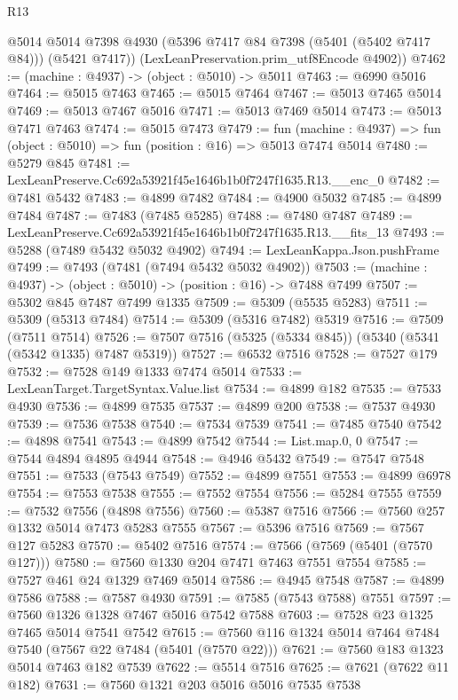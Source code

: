 \begin{lexlean}{R13}
\begin{coremodule}
        @5014
        @5014
        @7398
        @4930
        (@5396 @7417 @84 @7398 (@5401 (@5402 @7417 @84)))
        (@5421 @7417))
      (LexLeanPreservation.prim_utf8Encode @4902))
@7462 := (machine : @4937) -> (object : @5010) -> @5011
@7463 := @6990 @5016
@7464 := @5015 @7463
@7465 := @5015 @7464
@7467 := @5013 @7465 @5014
@7469 := @5013 @7467 @5016
@7471 := @5013 @7469 @5014
@7473 := @5013 @7471 @7463
@7474 := @5015 @7473
@7479 := fun (machine : @4937) => fun (object : @5010) => fun (position : @16) => @5013 @7474 @5014
@7480 := @5279 @845
@7481 := LexLeanPreserve.Cc692a53921f45e1646b1b0f7247f1635.R13.__enc_0
@7482 := @7481 @5432
@7483 := @4899 @7482
@7484 := @4900 @5032
@7485 := @4899 @7484
@7487 := @7483 (@7485 @5285)
@7488 := @7480 @7487
@7489 := LexLeanPreserve.Cc692a53921f45e1646b1b0f7247f1635.R13.__fits_13
@7493 := @5288 (@7489 @5432 @5032 @4902)
@7494 := LexLeanKappa.Json.pushFrame
@7499 := @7493 (@7481 (@7494 @5432 @5032 @4902))
@7503 := (machine : @4937) -> (object : @5010) -> (position : @16) -> @7488 @7499
@7507 := @5302 @845 @7487 @7499 @1335
@7509 := @5309 (@5535 @5283)
@7511 := @5309 (@5313 @7484)
@7514 := @5309 (@5316 @7482) @5319
@7516 := @7509 (@7511 @7514)
@7526 := @7507 @7516 (@5325 (@5334 @845)) (@5340 (@5341 (@5342 @1335) @7487 @5319))
@7527 := @6532 @7516
@7528 := @7527 @179
@7532 := @7528 @149 @1333 @7474 @5014
@7533 := LexLeanTarget.TargetSyntax.Value.list
@7534 := @4899 @182
@7535 := @7533 @4930
@7536 := @4899 @7535
@7537 := @4899 @200
@7538 := @7537 @4930
@7539 := @7536 @7538
@7540 := @7534 @7539
@7541 := @7485 @7540
@7542 := @4898 @7541
@7543 := @4899 @7542
@7544 := List.map.{0, 0}
@7547 := @7544 @4894 @4895 @4944
@7548 := @4946 @5432
@7549 := @7547 @7548
@7551 := @7533 (@7543 @7549)
@7552 := @4899 @7551
@7553 := @4899 @6978
@7554 := @7553 @7538
@7555 := @7552 @7554
@7556 := @5284 @7555
@7559 := @7532 @7556 (@4898 @7556)
@7560 := @5387 @7516
@7566 := @7560 @257 @1332 @5014 @7473 @5283 @7555
@7567 := @5396 @7516
@7569 := @7567 @127 @5283
@7570 := @5402 @7516
@7574 := @7566 (@7569 (@5401 (@7570 @127)))
@7580 := @7560 @1330 @204 @7471 @7463 @7551 @7554
@7585 := @7527 @461 @24 @1329 @7469 @5014
@7586 := @4945 @7548
@7587 := @4899 @7586
@7588 := @7587 @4930
@7591 := @7585 (@7543 @7588) @7551
@7597 := @7560 @1326 @1328 @7467 @5016 @7542 @7588
@7603 := @7528 @23 @1325 @7465 @5014 @7541 @7542
@7615 := @7560 @116 @1324 @5014 @7464 @7484 @7540 (@7567 @22 @7484 (@5401 (@7570 @22)))
@7621 := @7560 @183 @1323 @5014 @7463 @182 @7539
@7622 := @5514 @7516
@7625 := @7621 (@7622 @11 @182)
@7631 := @7560 @1321 @203 @5016 @5016 @7535 @7538

\end{coremodule}
\end{lexlean}
